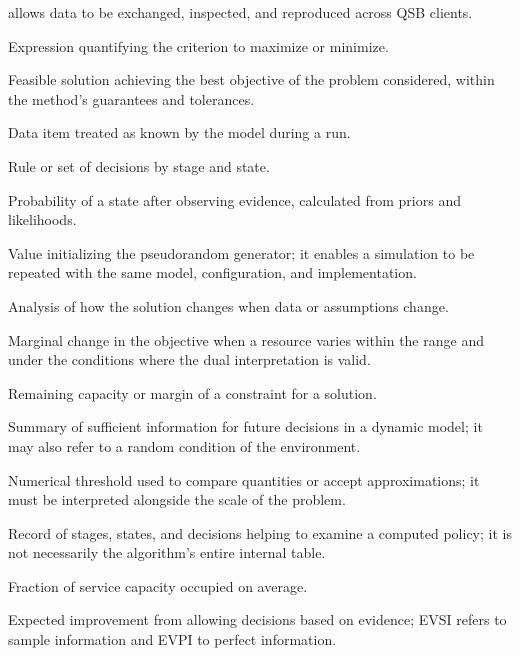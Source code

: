 \begin{description}
 allows data to be exchanged, inspected, and reproduced across QSB clients.
 \item[Objective function] Expression quantifying the criterion to maximize or minimize.
 \item[Optimal solution] Feasible solution achieving the best objective of the
 problem considered, within the method's guarantees and tolerances.
 \item[Parameter] Data item treated as known by the model during a run.
 \item[Policy] Rule or set of decisions by stage and state.
 \item[Posterior] Probability of a state after observing evidence, calculated
 from priors and likelihoods.
 \item[Seed] Value initializing the pseudorandom generator; it enables a
 simulation to be repeated with the same model, configuration, and implementation.
 \item[Sensitivity] Analysis of how the solution changes when data or assumptions change.
 \item[Shadow price] Marginal change in the objective when a resource varies
 within the range and under the conditions where the dual interpretation is valid.
 \item[Slack] Remaining capacity or margin of a constraint for a solution.
 \item[State] Summary of sufficient information for future decisions in a
 dynamic model; it may also refer to a random condition of the environment.
 \item[Tolerance] Numerical threshold used to compare quantities or accept
 approximations; it must be interpreted alongside the scale of the problem.
 \item[Trace] Record of stages, states, and decisions helping to examine a
 computed policy; it is not necessarily the algorithm's entire internal table.
 \item[Utilization] Fraction of service capacity occupied on average.
 \item[Value of information] Expected improvement from allowing decisions based
 on evidence; EVSI refers to sample information and EVPI to perfect information.
\end{description}
